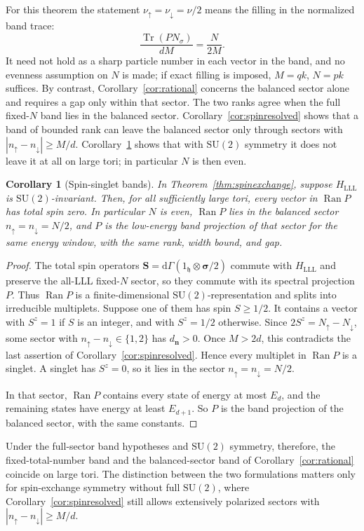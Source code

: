 \documentclass[11pt]{article}
\newtheorem{corollary}[theorem]{Corollary}
\theoremstyle{definition}
\theoremstyle{remark}
\newcommand{\Tr}{\operatorname{Tr}}
\newcommand{\Ran}{\operatorname{Ran}}
\newcommand{\dG}{\mathrm d\Gamma}
\newcommand{\up}{\uparrow}
\newcommand{\dn}{\downarrow}
\newcommand{\abs}[1]{\left|#1\right|}
\begin{document}
For this theorem the statement \(\nu_\up=\nu_\dn=\nu/2\)
means the filling in the normalized band trace:
\[
 \frac{\Tr(PN_\sigma)}{dM}=\frac{N}{2M}.
\]
It need not hold as a sharp particle number in each vector
in the band, and no evenness assumption on \(N\) is made; if exact
filling is imposed, \(M=qk\), \(N=pk\) suffices.
By contrast, Corollary~\ref{cor:rational} concerns the balanced
sector alone and requires a gap only within that sector.  The two
ranks agree when the full fixed-\(N\) band lies in the balanced
sector.  Corollary~\ref{cor:spinresolved} shows that a band of
bounded rank can leave the balanced sector only through sectors
with \(\abs{n_\up-n_\dn}\ge M/d\).  Corollary~\ref{cor:singlet}
shows that with \(\mathrm{SU}(2)\) symmetry it does not leave it at
all on large tori; in particular \(N\) is then even.


\begin{corollary}[Spin-singlet bands]\label{cor:singlet}
In Theorem~\ref{thm:spinexchange}, suppose \(H_{\mathrm{LLL}}\) is
\(\mathrm{SU}(2)\)-invariant.  Then, for all sufficiently large tori,
every vector in \(\Ran P\) has total spin zero.  In particular
\(N\) is even, \(\Ran P\) lies in the balanced sector
\(n_\up=n_\dn=N/2\), and \(P\) is the low-energy band projection of
that sector for the same energy window, with the same rank, width
bound, and gap.
\end{corollary}
\begin{proof}
The total spin operators
\(\bm S=\dG(1_{\mathfrak h}\otimes\bm\sigma/2)\) commute with
\(H_{\mathrm{LLL}}\) and preserve the all-LLL fixed-\(N\) sector, so
they commute with its spectral projection \(P\).  Thus \(\Ran P\) is
a finite-dimensional \(\mathrm{SU}(2)\)-representation and splits
into irreducible multiplets.  Suppose one of them has spin
\(S\ge1/2\).  It contains a vector with \(S^z=1\) if \(S\) is an
integer, and with \(S^z=1/2\) otherwise.  Since
\(2S^z=N_\up-N_\dn\), some sector with
\(n_\up-n_\dn\in\{1,2\}\) has \(d_{\bm n}>0\).  Once \(M>2d\), this
contradicts the last assertion of Corollary~\ref{cor:spinresolved}.
Hence every multiplet in \(\Ran P\) is a singlet.  A singlet has
\(S^z=0\), so it lies in the sector \(n_\up=n_\dn=N/2\).

In that sector, \(\Ran P\) contains every state of energy at most
\(E_d\), and the remaining states have energy at least
\(E_{d+1}\).  So \(P\) is the band projection of the balanced
sector, with the same constants.
\end{proof}

Under the full-sector band hypotheses and \(\mathrm{SU}(2)\) symmetry,
therefore, the fixed-total-number band and the balanced-sector band of Corollary~\ref{cor:rational}
coincide on large tori.  The distinction between the two
formulations matters only for spin-exchange symmetry without full
\(\mathrm{SU}(2)\), where Corollary~\ref{cor:spinresolved} still
allows extensively polarized sectors with
\(\abs{n_\up-n_\dn}\ge M/d\).
\end{document}
